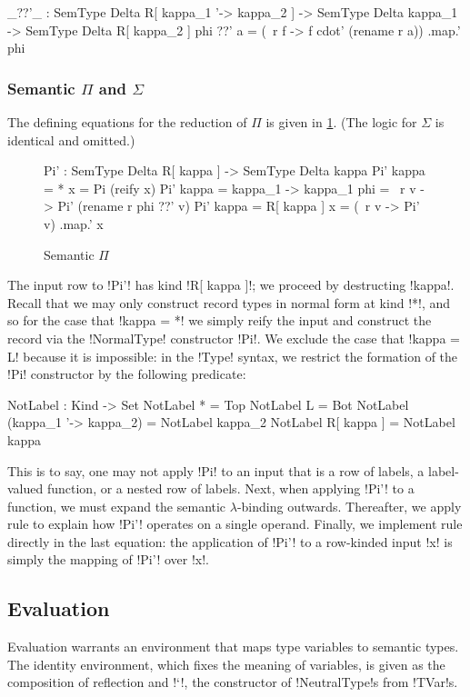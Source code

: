 \documentclass[sigplan,10pt,review]{acmart}\settopmatter{printfolios=true,printccs=false,printacmref=false}
\begin{document}
\begin{agda}
_??'_ : SemType Delta R[ kappa_1 '-> kappa_2 ] -> 
       SemType Delta kappa_1 -> SemType Delta R[ kappa_2 ]
phi ??' a = (\ r f -> f cdot' (rename r a)) .map.' phi
\end{agda}

\subsubsection{Semantic $\Pi$ and $\Sigma$} The defining equations for the reduction of $\Pi$ is given in \cref{fig:semantic-pi}. (The logic for $\Sigma$ is identical and omitted.)

\begin{figure}
\begin{agda}
Pi' : SemType Delta R[ kappa ] -> SemType Delta kappa
Pi' {kappa = *} x = Pi (reify x)
Pi' {kappa = kappa_1 -> kappa_1} phi = \ r v -> Pi' (rename r phi ??' v)
Pi' {kappa = R[ kappa ]} x = (\ r v -> Pi' v) .map.' x
\end{agda}
\caption{Semantic $\Pi$}
\label{fig:semantic-pi}
\end{figure}
 
The input row to !Pi'! has kind !R[ kappa ]!; we proceed by destructing !kappa!. Recall that we may only construct record types in normal form at kind !*!, and so for the case that !kappa = *! we simply reify the input and construct the record via the !NormalType! constructor !Pi!. We exclude the case that !kappa = L! because it is impossible: in the !Type! syntax, we restrict the formation of the !Pi! constructor by the following predicate:

\begin{agda}
NotLabel : Kind -> Set
NotLabel * = Top
NotLabel L = Bot
NotLabel (kappa_1 '-> kappa_2) = NotLabel kappa_2
NotLabel R[ kappa ] = NotLabel kappa
\end{agda}

This is to say, one may not apply !Pi! to an input that is a row of labels, a label-valued function, or a nested row of labels. Next, when applying !Pi'! to a function, we must expand the semantic $\lambda$-binding outwards. Thereafter, we apply rule  to explain how !Pi'! operates on a single operand. Finally, we implement rule \errule{$\Xi$} directly in the last equation: the application of !Pi'! to a row-kinded input !x! is simply the mapping of !Pi'!  over !x!.

\subsection{Evaluation}
Evaluation warrants an environment that maps type variables to semantic types. The identity environment, which fixes the meaning of variables, is given as the composition of reflection and !`!, the constructor of !NeutralType!s from !TVar!s. 
\end{document}
